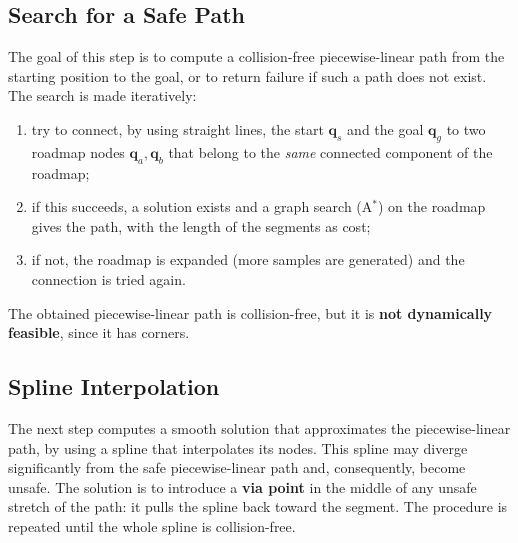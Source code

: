 \documentclass[10pt, a4paper]{report}
\newcommand{\q}{{\mathbf q}}
\begin{document}
\subsection{Search for a Safe Path}
The goal of this step is to compute a collision-free piecewise-linear path from the starting position to the goal, or to return failure if such a path does not exist. The search is made iteratively:\begin{enumerate}
    \item try to connect, by using straight lines, the start $\q_s$ and the goal $\q_g$ to two roadmap nodes $\q_a,\q_b$ that belong to the \textit{same} connected component of the roadmap;
    \item if this succeeds, a solution exists and a graph search (A$^*$) on the roadmap gives the path, with the length of the segments as cost;
    \item if not, the roadmap is expanded (more samples are generated) and the connection is tried again.
\end{enumerate}
The obtained piecewise-linear path is collision-free, but it is \textbf{not dynamically feasible}, since it has corners.
\subsection{Spline Interpolation}
The next step computes a smooth solution that approximates the piecewise-linear path, by using a spline that interpolates its nodes. This spline may diverge significantly from the safe piecewise-linear path and, consequently, become unsafe. The solution is to introduce a \textbf{via point} in the middle of any unsafe stretch of the path: it pulls the spline back toward the segment. The procedure is repeated until the whole spline is collision-free.\bigskip
\end{document}
